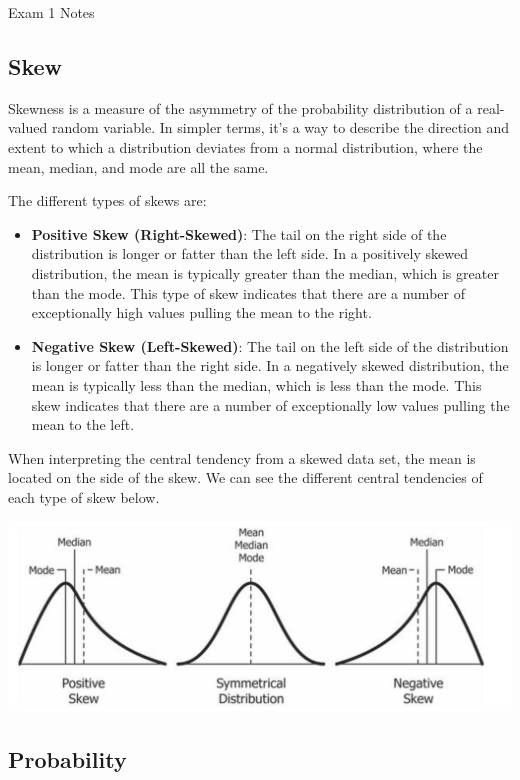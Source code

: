 \begin{examnotes}{Exam 1 Notes}
    \subsection*{Skew}

    Skewness is a measure of the asymmetry of the probability distribution of a real-valued random variable. In simpler terms, it's a way to describe the direction and extent to which a distribution 
    deviates from a normal distribution, where the mean, median, and mode are all the same.

    The different types of skews are:

    \begin{itemize}
        \item \textbf{Positive Skew (Right-Skewed)}: The tail on the right side of the distribution is longer or fatter than the left side. In a positively skewed distribution, the mean is typically 
        greater than the median, which is greater than the mode. This type of skew indicates that there are a number of exceptionally high values pulling the mean to the right.
        \item \textbf{Negative Skew (Left-Skewed)}: The tail on the left side of the distribution is longer or fatter than the right side. In a negatively skewed distribution, the mean is typically 
        less than the median, which is less than the mode. This skew indicates that there are a number of exceptionally low values pulling the mean to the left.
    \end{itemize}

    When interpreting the central tendency from a skewed data set, the mean is located on the side of the skew. We can see the different central tendencies of each type of skew below.

    \begin{center}
        \includegraphics[scale = 0.75]{Images/Skew.png}
    \end{center}

    \subsection*{Probability}


\end{examnotes}
